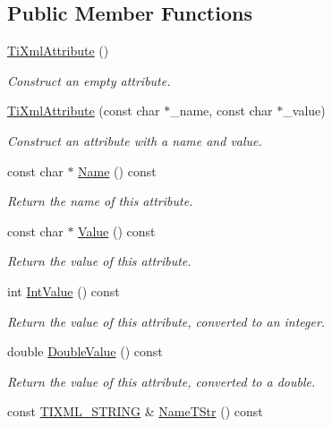 \subsection*{Public Member Functions}
\begin{DoxyCompactItemize}
\item 
\hyperlink{class_ti_xml_attribute_a9cfa3c8179873fd485d83003b114f8e1}{Ti\+Xml\+Attribute} ()
\begin{DoxyCompactList}\small\item\em Construct an empty attribute. \end{DoxyCompactList}\item 
\hyperlink{class_ti_xml_attribute_a759d0b76fb8fcf765ecab243bc14f05e}{Ti\+Xml\+Attribute} (const char $\ast$\+\_\+name, const char $\ast$\+\_\+value)
\begin{DoxyCompactList}\small\item\em Construct an attribute with a name and value. \end{DoxyCompactList}\item 
const char $\ast$ \hyperlink{class_ti_xml_attribute_a008ef948268ee752b58c60d63d84bb01}{Name} () const
\begin{DoxyCompactList}\small\item\em Return the name of this attribute. \end{DoxyCompactList}\item 
const char $\ast$ \hyperlink{class_ti_xml_attribute_ac9f0b56fcacbedb6eb49e5f282bef014}{Value} () const
\begin{DoxyCompactList}\small\item\em Return the value of this attribute. \end{DoxyCompactList}\item 
int \hyperlink{class_ti_xml_attribute_ac8501370b065df31a35003c81d87cef2}{Int\+Value} () const
\begin{DoxyCompactList}\small\item\em Return the value of this attribute, converted to an integer. \end{DoxyCompactList}\item 
double \hyperlink{class_ti_xml_attribute_a8cca240fb2a7130c87b0fc6156e8b34f}{Double\+Value} () const
\begin{DoxyCompactList}\small\item\em Return the value of this attribute, converted to a double. \end{DoxyCompactList}\item 
const \hyperlink{tinyxml_8h_a92bada05fd84d9a0c9a5bbe53de26887}{T\+I\+X\+M\+L\+\_\+\+S\+T\+R\+I\+NG} \& \hyperlink{class_ti_xml_attribute_a2bd49ec37463a0a2d081e6587f8b89b8}{Name\+T\+Str} () const

\end{DoxyCompactItemize}
